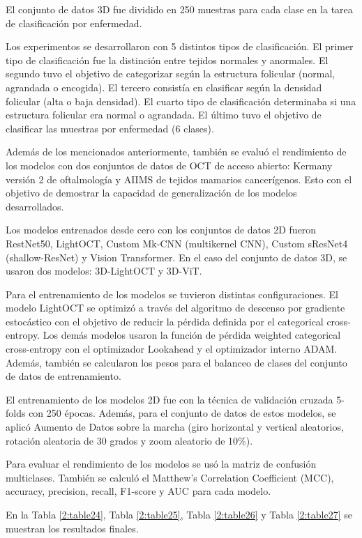 El conjunto de datos 3D fue dividido en 250 muestras para cada clase en la tarea de clasificación por enfermedad.

Los experimentos se desarrollaron con 5 distintos tipos de clasificación. El primer tipo de clasificación fue la distinción entre tejidos normales y anormales. El segundo tuvo el objetivo de categorizar según la estructura folicular (normal, agrandada o encogida). El tercero consistía en clasificar según la densidad folicular (alta o baja densidad). El cuarto tipo de clasificación determinaba si una estructura folicular era normal o agrandada. El último tuvo el objetivo de clasificar las muestras por enfermedad (6 clases).

Además de los mencionados anteriormente, también se evaluó el rendimiento de los modelos con dos conjuntos de datos de OCT de acceso abierto: Kermany versión 2 de oftalmología y AIIMS de tejidos mamarios cancerígenos. Esto con el objetivo de demostrar la capacidad de generalización de los modelos desarrollados.

Los modelos entrenados desde cero con los conjuntos de datos 2D fueron RestNet50, LightOCT, Custom Mk-CNN (multikernel CNN), Custom sResNet4 (shallow-ResNet) y Vision Transformer. En el caso del conjunto de datos 3D, se usaron dos modelos: 3D-LightOCT y 3D-ViT.

Para el entrenamiento de los modelos se tuvieron distintas configuraciones. El modelo LightOCT se optimizó a través del algoritmo de descenso por gradiente estocástico con el objetivo de reducir la pérdida definida por el categorical cross-entropy. Los demás modelos usaron la función de pérdida weighted categorical cross-entropy con el optimizador Lookahead y el optimizador interno ADAM. Además, también se calcularon los pesos para el balanceo de clases del conjunto de datos de entrenamiento.

El entrenamiento de los modelos 2D fue con la técnica de validación cruzada 5-folds con 250 épocas. Además, para el conjunto de datos de estos modelos, se aplicó Aumento de Datos sobre la marcha (giro horizontal y vertical aleatorios, rotación aleatoria de 30 grados y zoom aleatorio de 10\%).

Para evaluar el rendimiento de los modelos se usó la matriz de confusión multiclases. También se calculó el Matthew’s Correlation Coefficient (MCC), accuracy, precision, recall, F1-score y AUC para cada modelo.

En la Tabla \ref{2:table24}, Tabla \ref{2:table25}, Tabla \ref{2:table26} y Tabla \ref{2:table27} se muestran los resultados finales.

